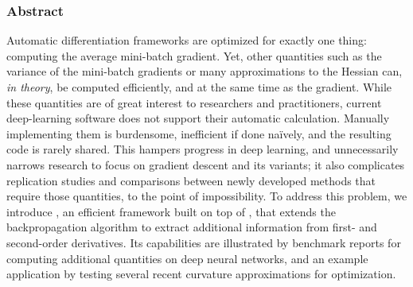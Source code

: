 \subsubsection{Abstract}

Automatic differentiation frameworks are optimized for exactly one thing:
computing the average mini-batch gradient. Yet, other quantities such as the
variance of the mini-batch gradients or many approximations to the Hessian can,
\emph{in theory}, be computed efficiently, and at the same time as the gradient.
While these quantities are of great interest to researchers and practitioners,
current deep-learning software does not support their automatic calculation.
Manually implementing them is burdensome, inefficient if done na\"ively, and the
resulting code is rarely shared. This hampers progress in deep learning, and
unnecessarily narrows research to focus on gradient descent and its variants; it
also complicates replication studies and comparisons between newly developed
methods that require those quantities, to the point of impossibility. To address
this problem, we introduce \BackPACK, an efficient framework built on top of
\PyTorch, that extends the backpropagation algorithm to extract additional
information from first- and second-order derivatives. Its capabilities are
illustrated by benchmark reports for computing additional quantities on deep
neural networks, and an example application by testing several recent curvature
approximations for optimization.

%

